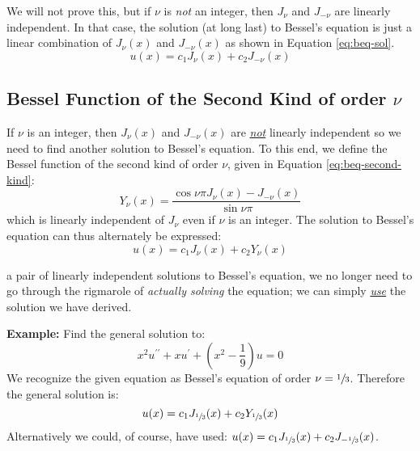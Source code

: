 We will not prove this, but if $\nu$ is \emph{not} an integer, then $J_{\nu}$ and $J_{-\nu}$ are linearly independent. In that case, the solution (at long last) to Bessel's equation is just a linear combination of $J_{\nu}(x)$ and $J_{-\nu}(x)$ as shown in Equation \ref{eq:beq-sol}.
\begin{equation}
u(x) = c_1J_{\nu}(x) + c_2J_{-\nu}(x)
\label{eq:beq-sol}
\end{equation}

\subsection{Bessel Function of the Second Kind of order $\nu$}
If $\nu$ is an integer, then $J_{\nu}(x)$ and $J_{-\nu}(x)$ are \emph{\underline{not}} linearly independent so we need to find another solution to Bessel's equation.  To this end, we define the Bessel function of the second kind of order $\nu$, given in Equation \ref{eq:beq-second-kind}:
\begin{equation}
Y_{\nu}(x) = \frac{\cos{\nu \pi} J_{\nu}(x) - J_{-\nu}(x)}{\sin{\nu \pi}}
\label{eq:beq-second-kind}
\end{equation}
which is linearly independent of $J_{\nu}$ even if $\nu$ is an integer.  The solution to Bessel's equation can thus alternately be expressed:
\begin{equation*}
u(x) = c_1J_{\nu}(x) + c_2Y_{\nu}(x)
\end{equation*}

 a pair of linearly independent solutions to Bessel's equation, we no longer need to go through the rigmarole of \emph{actually solving} the equation; we can simply \emph{\underline{use}} the solution we have derived.

\vspace{1.0cm}

\noindent\textbf{Example:} Find the general solution to:
\begin{equation*}
x^2u^{\prime \prime} + xu^{\prime} + \left(x^2 - \frac{1}{9} \right)u = 0
\end{equation*}
We recognize the given equation as Bessel's equation of order $\nu = \sfrac{1}{3}$.  Therefore the general solution is: 
\begin{equation*}
u(x) = c_1J_{\sfrac{1}{3}}(x) + c_2Y_{\sfrac{1}{3}}(x)
\end{equation*}
Alternatively we could, of course, have used: $u(x) = c_1J_{\sfrac{1}{3}}(x) + c_2J_{-\sfrac{1}{3}}(x)$.

